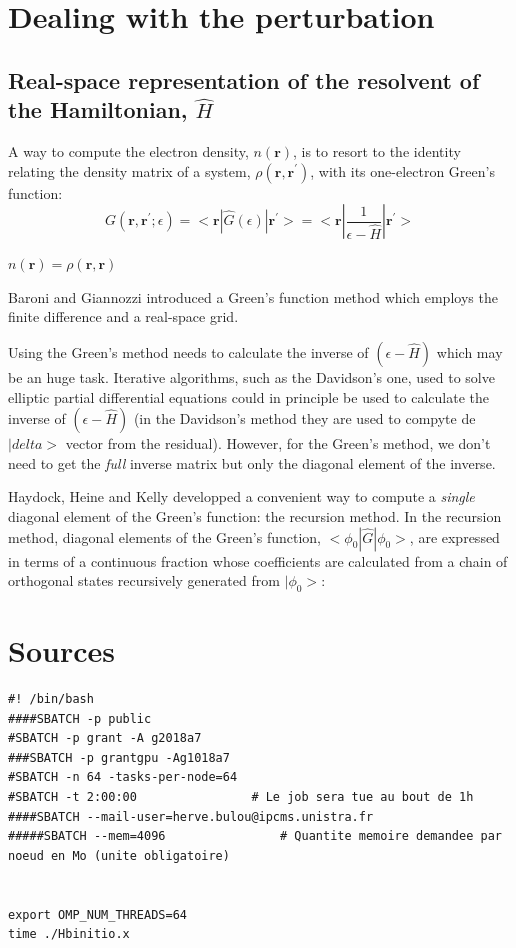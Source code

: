 \documentclass[11pt,a4paper]{article}
\begin{document}
\section{Dealing with the perturbation}

\subsection{Real-space representation of the resolvent of the Hamiltonian, $\hat{H}$}

 
A way to compute the electron density, $n(\bm{r})$, is to resort to the identity relating the density matrix of a system, $\rho(\bm{r},\bm{r}^\prime)$, with its one-electron Green's function:
\begin{equation}
  G(\bm{r},\bm{r}^\prime;\epsilon)=<\bm{r}|\hat{G}(\epsilon)|\bm{r}^\prime>=<\bm{r}|\frac{1}{\epsilon-\hat{H}}|\bm{r}^\prime>
\end{equation}

$n(\bm{r})=\rho(\bm{r},\bm{r})$

Baroni and Giannozzi\cite{baroni1991} introduced a Green's function method which employs the finite difference and a real-space grid.

Using the Green's method needs to calculate the inverse of $(\epsilon-\hat{H})$ which may be an huge task.
Iterative algorithms, such as the Davidson's one, used to solve elliptic partial differential equations could in principle be used to calculate the inverse of   $(\epsilon-\hat{H})$  (in the Davidson's method they are used to compyte de $|delta>$ vector from the residual).
However, for the Green's method, we don't need to get the \emph{full} inverse matrix but only the diagonal element of the inverse.

Haydock, Heine and Kelly\cite{haydock1980,giannozzi1988} developped a convenient way to compute a \emph{single} diagonal element of the Green's function: the recursion method.
In the recursion method, diagonal elements of the Green's function, $<\phi_0|\hat{G}|\phi_0>$, are expressed in terms of a continuous fraction whose coefficients are calculated from a chain of orthogonal states recursively generated from $|\phi_0>$:


\section{Sources}
\label{Sources}


 
\begin{verbatim}
#! /bin/bash
####SBATCH -p public
#SBATCH -p grant -A g2018a7
###SBATCH -p grantgpu -Ag1018a7
#SBATCH -n 64 -tasks-per-node=64
#SBATCH -t 2:00:00                # Le job sera tue au bout de 1h
####SBATCH --mail-user=herve.bulou@ipcms.unistra.fr
#####SBATCH --mem=4096                # Quantite memoire demandee par noeud en Mo (unite obligatoire)


export OMP_NUM_THREADS=64
time ./Hbinitio.x

\end{verbatim}
\end{document}
